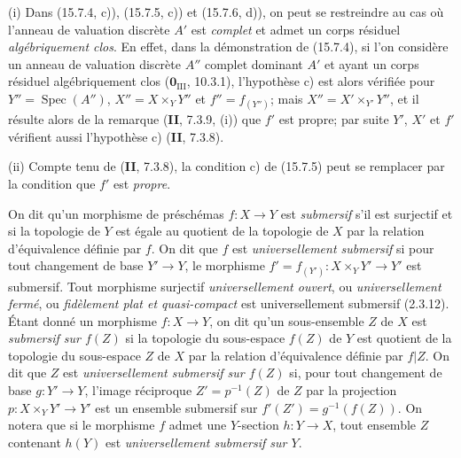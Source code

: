 \begin{remarks}[15.7.7]
\label{IV.15.7.7-fr}
(i) Dans (15.7.4, c)), (15.7.5, c)) et (15.7.6, d)), on peut se restreindre au cas où l'anneau de valuation discrète $A'$ est \emph{complet} et admet un corps résiduel \emph{algébriquement clos}. En effet, dans la démonstration de (15.7.4), si l'on considère un anneau de valuation discrète $A''$ complet dominant $A'$ et ayant un corps résiduel algébriquement clos ($\mathbf{0}_{\mathrm{III}}$, 10.3.1), l'hypothèse c) est alors vérifiée pour $Y''=\operatorname{Spec}(A'')$, $X''=X\times_Y Y''$ et $f''=f_{(Y'')}$; mais $X''=X'\times_{Y'}Y''$, et il résulte alors de la remarque (\textbf{II}, 7.3.9, (i)) que $f'$ est propre; par suite $Y'$, $X'$ et $f'$ vérifient aussi l'hypothèse c) (\textbf{II}, 7.3.8).

(ii) Compte tenu de (\textbf{II}, 7.3.8), la condition c) de (15.7.5) peut se remplacer par la condition que $f'$ est \emph{propre}.
\end{remarks}

\begin{env}[15.7.8]
\label{IV.15.7.8-fr}
On dit qu'un morphisme de préschémas $f:X\to Y$ est \emph{submersif} s'il est surjectif et si la topologie de $Y$ est égale au quotient de la topologie de $X$ par la relation d'équivalence définie par $f$. On dit que $f$ est \emph{universellement submersif} si pour tout changement de base $Y'\to Y$, le morphisme $f'=f_{(Y')}:X\times_Y Y'\to Y'$ est submersif. Tout morphisme surjectif \emph{universellement ouvert}, ou \emph{universellement fermé}, ou \emph{fidèlement plat et quasi-compact} est universellement submersif (2.3.12). Étant donné un morphisme $f:X\to Y$, on dit qu'un sous-ensemble $Z$ de $X$ est \emph{submersif sur $f(Z)$} si la topologie du sous-espace $f(Z)$ de $Y$ est quotient de la topologie du sous-espace $Z$ de $X$ par la relation d'équivalence définie par $f|Z$. On dit que $Z$ est \emph{universellement submersif sur $f(Z)$} si, pour tout changement de base $g:Y'\to Y$, l'image réciproque $Z'=p^{-1}(Z)$ de $Z$ par la projection $p:X\times_Y Y'\to Y'$ est un ensemble submersif sur $f'(Z')=g^{-1}(f(Z))$. On notera que si le morphisme $f$ admet une $Y$-section $h:Y\to X$, tout ensemble $Z$ contenant $h(Y)$ est \emph{universellement submersif sur $Y$}.
\end{env}

